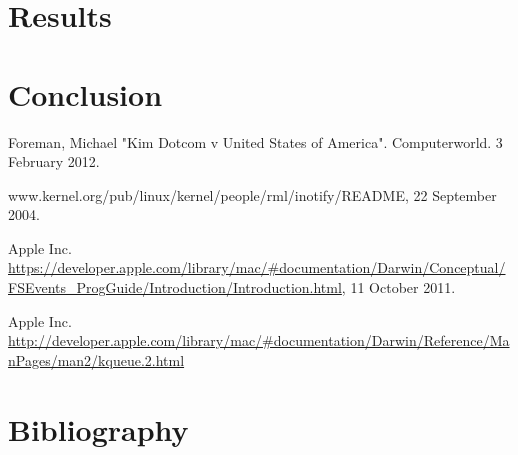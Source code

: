 \documentclass[12pt]{article}
\begin{document}

\section{Results}

\section{Conclusion}

\begin{thebibliography}{9}

Foreman, Michael "Kim Dotcom v United States of America". Computerworld. 3 February 2012.

www.kernel.org/pub/linux/kernel/people/rml/inotify/README, 22 September 2004.

Apple Inc. \url{https://developer.apple.com/library/mac/#documentation/Darwin/Conceptual/FSEvents_ProgGuide/Introduction/Introduction.html}, 11 October 2011.

Apple Inc. \url{http://developer.apple.com/library/mac/#documentation/Darwin/Reference/ManPages/man2/kqueue.2.html}

\end{thebibliography}

\section{Bibliography}
\end{document}

